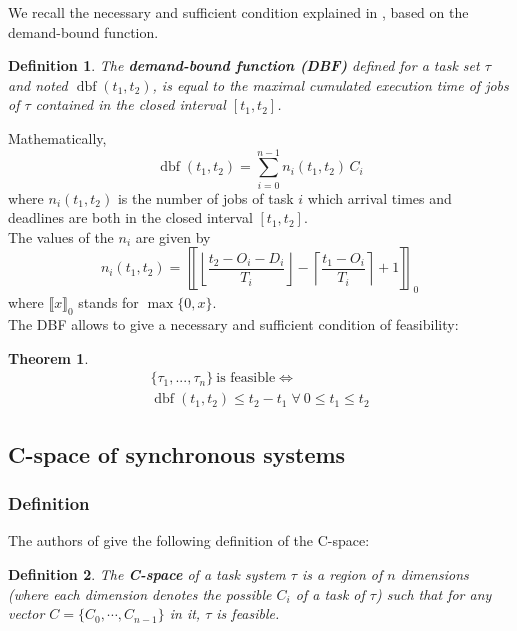 \documentclass[times, 10pt,twocolumn, a4paper]{article}
\newtheorem{theorem}{Theorem}
\newtheorem{definition}{Definition}
\newcommand{\dbf}[1]{\operatorname{dbf}(#1)}
\begin{document}
	We recall the necessary and sufficient condition explained in \cite{baruah1999generalized, baruah1990algorithms}, based on the demand-bound function.

	\begin{definition}
		The \textbf{demand-bound function (DBF)}
		defined for a task set $\tau$ and noted $\dbf{t_1, t_2}$, is equal to
		the maximal cumulated execution time of jobs of $\tau$ contained in the
		closed interval $[t_1, t_2]$.
	\end{definition}

	Mathematically,
	\[
		\dbf{t_1, t_2} = \sum_{i=0}^{n-1} n_i(t_1, t_2) \, C_i
	\]
	where $n_i(t_1, t_2)$ is the number of jobs of task $i$ which arrival times
	and deadlines are both in the closed interval $[t_1, t_2]$.\\

	The values of the $n_i$ are given by
	\[
		n_i(t_1, t_2) =
		\left\llbracket
			\left\lfloor
				\frac{t_2 - O_i - D_i}{T_i}
			\right\rfloor -
			\left\lceil
				\frac{t_1 - O_i}{T_i}
			\right\rceil + 1
		\right\rrbracket_0
	\]
	where $\llbracket x \rrbracket_0$ stands for $\max \{ 0, x \}$.\\

	The DBF allows to give a necessary and sufficient condition of feasibility:

	\begin{theorem}
	\[
		\begin{array}{c}
			\{\tau_1, ..., \tau_n\} \: \text{is feasible}  \iff \\
			\dbf{t_1, t_2} \leq t_2 - t_1 \; \forall \: 0 \leq t_1 \leq t_2
		\end{array}
	\]
	\end{theorem}

	\subsection{C-space of synchronous systems}

		\subsubsection{Definition}

			The authors of \cite{george2009characterization} give the following definition of the C-space:
			\begin{definition}
				The \textbf{C-space} of a task system $\tau$ is a region of $n$ dimensions (where each dimension denotes the possible $C_i$ of a task of $\tau$) such that for any vector $C = \{ C_0, \cdots, C_{n-1}\}$ in it, $\tau$ is feasible.
			\end{definition}
\end{document}

